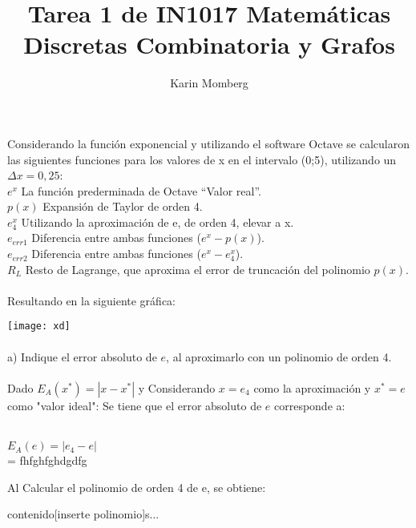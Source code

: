 \documentclass[]{article}
\title{Tarea 1 de IN1017 Matemáticas Discretas Combinatoria y Grafos}
\author{Karin Momberg}
\begin{document}
\maketitle
Considerando la función exponencial y utilizando el software Octave se calcularon las siguientes funciones para los valores de x en el intervalo (0;5), utilizando un $\Delta x = 0,25$: \\
$e^{x}$ \hspace{5mm} La función prederminada de Octave “Valor real”. \\
$p(x)$ \hspace{2mm} Expansión de Taylor de orden 4. \\
$e^{x}_{4}$ \hspace{5mm} Utilizando la aproximación de e, de orden 4, elevar a x. \\
$e_{err1}$ \hspace{1mm} Diferencia entre ambas funciones ($e^{x} - p(x)$). \\
$e_{err2}$ \hspace{1mm} Diferencia entre ambas funciones ($e^{x} - e^{x}_{4}$). \\
$R_{L}$ \hspace{3mm} Resto de Lagrange, que aproxima el error de truncación del polinomio $p(x)$. \\\\
Resultando en la siguiente gráfica:

\texttt{[image: xd]} \\\\


a) Indique el error absoluto de $e$, al aproximarlo con un polinomio de orden 4. \\\\



Dado $E_{A} (x^{*}) = |x-x^{*}|$ y Considerando $x = e_{4}$ como la aproximación y $x^{*} = e$ como "valor ideal": Se tiene que el error absoluto de $e$ corresponde a: \\\\
\begin{center} $E_{A} (e) = |e_{4}-e|$ \\
	= fhfghfghdgdfg
\end{center}

Al Calcular el polinomio de orden 4 de e, se obtiene:
\begin{center}
	contenido[inserte polinomio]s...
\end{center}
\end{document}
